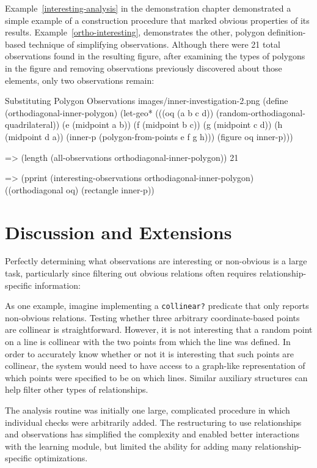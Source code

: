 Example~\ref{interesting-analysis} in the demonstration chapter
demonstrated a simple example of a construction procedure that marked
obvious properties of its results. Example~\ref{ortho-interesting},
demonstrates the other, polygon definition-based technique of
simplifying observations. Although there were 21 total observations
found in the resulting figure, after examining the types of polygons
in the figure and removing observations previously discovered about
those elements, only two observations remain:

\begin{img-example}
[label=ortho-interesting]
{Substituting Polygon Observations}
{images/inner-investigation-2.png}
(define (orthodiagonal-inner-polygon)
  (let-geo*
      (((oq (a b c d)) (random-orthodiagonal-quadrilateral))
       (e (midpoint a b))
       (f (midpoint b c))
       (g (midpoint c d))
       (h (midpoint d a))
       (inner-p (polygon-from-points e f g h)))
    (figure oq inner-p)))

=> (length (all-observations orthodiagonal-inner-polygon))
21

=> (pprint (interesting-observations orthodiagonal-inner-polygon)
((orthodiagonal oq) (rectangle inner-p))
\end{img-example}

\section{Discussion and Extensions}

Perfectly determining what observations are interesting or non-obvious
is a large task, particularly since filtering out obvious relations
often requires relationship-specific information:

As one example, imagine implementing a \texttt{collinear?}  predicate
that only reports non-obvious relations. Testing whether three
arbitrary coordinate-based points are collinear is
straightforward. However, it is not interesting that a random point on
a line is collinear with the two points from which the line was
defined. In order to accurately know whether or not it is interesting
that such points are collinear, the system would need to have access
to a graph-like representation of which points were specified to be on
which lines. Similar auxiliary structures can help filter other types
of relationships.

The analysis routine was initially one large, complicated procedure in
which individual checks were arbitrarily added. The restructuring to
use relationships and observations has simplified the complexity and
enabled better interactions with the learning module, but limited the
ability for adding many relationship-specific optimizations.

